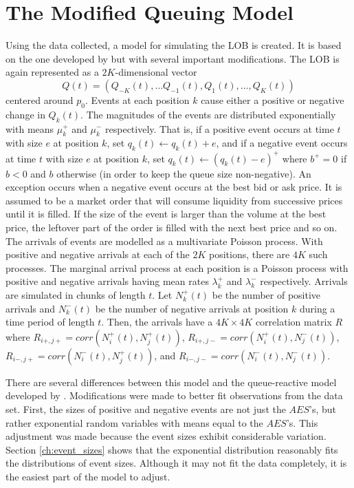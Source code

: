 \section{The Modified Queuing Model}\label{ch:queue_model}
Using the data collected, a model for simulating the LOB is created. It is based on the one developed by \cite{A6} but with several important modifications. The LOB is again represented as a $2K$-dimensional vector $$Q(t) = (Q_{-K}(t), \ldots Q_{-1}(t), Q_1(t), \ldots , Q_K(t))$$ centered around $p_0$. Events at each position $k$ cause either a positive or negative change in $Q_k(t)$. The magnitudes of the events are distributed exponentially with means $\mu^+_k$ and $\mu^-_k$ respectively. That is, if a positive event occurs at time $t$ with size $e$ at position $k$, set $q_k(t) \leftarrow q_k(t) + e$, and if a negative event occurs at time $t$ with size $e$ at position $k$, set $q_k(t) \leftarrow (q_k(t) - e)^+$ where $b^+ = 0$ if $b < 0$ and $b$ otherwise (in order to keep the queue size non-negative). An exception occurs when a negative event occurs at the best bid or ask price. It is assumed to be a market order that will consume liquidity from successive prices until it is filled. If the size of the event is larger than the volume at the best price, the leftover part of the order is filled with the next best price and so on. The arrivals of events are modelled as a multivariate Poisson process. With positive and negative arrivals at each of the $2K$ positions, there are $4K$ such processes. The marginal arrival process at each position is a Poisson process with positive and negative arrivals having mean rates $\lambda^+_k$ and $\lambda^-_k$ respectively. Arrivals are simulated in chunks of length $t$. Let $N^+_k(t)$ be the number of positive arrivals and $N^-_k(t)$ be the number of negative arrivals at position $k$ during a time period of length $t$. Then, the arrivals have a $4K\times4K$ correlation matrix $R$ where $R_{i+,j+} = corr(N^+_i(t), N^+_j(t))$, $R_{i+,j-} = corr(N^+_i(t), N^-_j(t))$, $R_{i-,j+} = corr(N^-_i(t), N^+_j(t))$, and $R_{i-,j-} = corr(N^-_i(t), N^-_j(t))$.

There are several differences between this model and the queue-reactive model developed by \cite{A6}. Modifications were made to better fit observations from the data set. First, the sizes of positive and negative events are not just the $AES$'s, but rather exponential random variables with means equal to the $AES$'s. This adjustment was made because the event sizes exhibit considerable variation. Section \ref{ch:event_sizes} shows that the exponential distribution reasonably fits the distributions of event sizes. Although it may not fit the data completely, it is the easiest part of the model to adjust.

